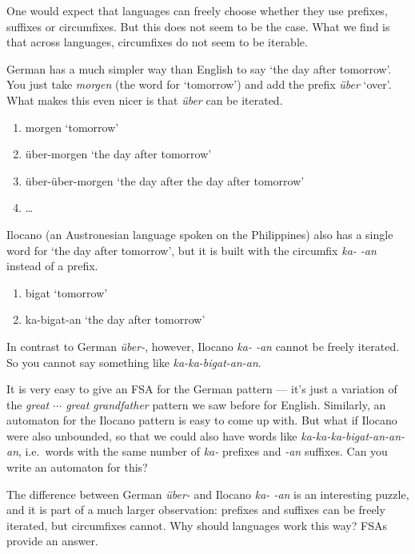 One would expect that languages can freely choose whether they use prefixes, suffixes or circumfixes.
But this does not seem to be the case.
What we find is that across languages, circumfixes do not seem to be iterable.
%
\begin{examplebox}
    German has a much simpler way than English to say `the day after tomorrow'.
    You just take \emph{morgen} (the word for `tomorrow') and add the prefix \emph{über} `over'.
    What makes this even nicer is that \emph{über} can be iterated.
    \begin{enumerate}
        \item morgen `tomorrow'
        \item über-morgen `the day after tomorrow'
        \item über-über-morgen `the day after the day after tomorrow'
        \item \ldots
    \end{enumerate}
    Ilocano (an Austronesian language spoken on the Philippines) also has a single word for `the day after tomorrow', but it is built with the circumfix \emph{ka- -an} instead of a prefix.
    \begin{enumerate}
        \item bigat `tomorrow'
        \item ka-bigat-an `the day after tomorrow'
    \end{enumerate}
    In contrast to German \emph{über-}, however, Ilocano \emph{ka- -an} cannot be freely iterated.
    So you cannot say something like \emph{ka-ka-bigat-an-an}.
\end{examplebox}
%
\begin{homework}
    It is very easy to give an FSA for the German pattern --- it's just a variation of the \emph{great $\cdots$ great grandfather} pattern we saw before for English.
    Similarly, an automaton for the Ilocano pattern is easy to come up with.
    But what if Ilocano were also unbounded, so that we could also have words like \emph{ka-ka-ka-bigat-an-an-an}, i.e.\ words with the same number of \emph{ka-} prefixes and \emph{-an} suffixes.
    Can you write an automaton for this?
\end{homework}
%
The difference between German \emph{über-} and Ilocano \emph{ka- -an} is an interesting puzzle, and it is part of a much larger observation: prefixes and suffixes can be freely iterated, but circumfixes cannot.
Why should languages work this way?
FSAs provide an answer.


